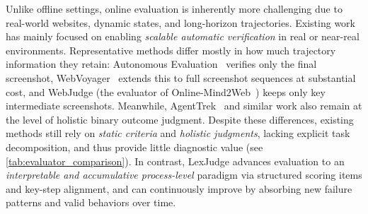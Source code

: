 Unlike offline settings, online evaluation is inherently more challenging due to real-world websites, dynamic states, and long-horizon trajectories. Existing work has mainly focused on enabling \emph{scalable automatic verification} in real or near-real environments. Representative methods differ mostly in how much trajectory information they retain: Autonomous Evaluation~\cite{pan2024autonomousevaluationrefinementdigital} verifies only the final screenshot, WebVoyager~\cite{he2024webvoyagerbuildingendtoendweb} extends this to full screenshot sequences at substantial cost, and WebJudge (the evaluator of Online-Mind2Web~\cite{online-mind2web}) keeps only key intermediate screenshots. Meanwhile, AgentTrek~\cite{xu2025agenttrekagenttrajectorysynthesis} and similar work also remain at the level of holistic binary outcome judgment. Despite these differences, existing methods still rely on \emph{static criteria} and \emph{holistic judgments}, lacking explicit task decomposition, and thus provide little diagnostic value (see \cref{tab:evaluator_comparison}). In contrast, LexJudge advances evaluation to an \emph{interpretable and accumulative process-level} paradigm via structured scoring items and key-step alignment, and can continuously improve by absorbing new failure patterns and valid behaviors over time.




